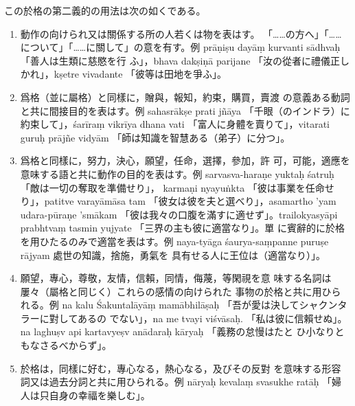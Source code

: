 \begin{enumerate}[label=(\arabic*)]
この於格の第二義的の用法は次の如くである。
\begin{enumerate}[label=(\alph*)]
\item 動作の向けられ又は關係する所の人若くは物を表はす。
「……の方へ」「……について」「……に關して」の意を有す。例
prāṇiṣu dayāṃ kurvanti sādhvaḥ 「善人は生類に慈愍を行
ふ」，bhava dakṣiṇā parijane 「汝の從者に禮儀正しかれ」，kṣetre
vivadante 「彼等は田地を爭ふ」。
\item 爲格（並に屬格）と同樣に，贈與，報知，約束，購買，賣渡
の意義ある動詞と共に間接目的を表はす。例 sahasrākṣe prati\-%
jñāya 「千眼（のインドラ）に約束して」，śarīraṃ vikrīya dhana\-%
vati 「富人に身體を賣りて」，vitarati guruḥ prājñe vidyām
「師は知識を智慧ある（弟子）に分つ」。
\item 爲格と同樣に，努力，決心，願望，任命，選擇，參加，許
可，可能，適應を意味する語と共に動作の目的を表はす。例
sarvasva-haraṇe yuktaḥ śatruḥ 「敵は一切の奪取を準備せり」，
karmaṇi nyayuṅkta 「彼は事業を任命せり」，patitve varayāmāsa
tam 「彼女は彼を夫と選べり」，asamartho 'yam udara-pūraṇe
'smākam 「彼は我々の口腹を滿すに適せず」。trailokyasyāpi
prabhtvaṃ tasmin yujyate 「三界の主も彼に適當なり」。單
に賓辭的に於格を用ひたるのみで適當を表はす。例 naya-tyāga\-%
śaurya-saṃpanne puruṣe rājyam 處世の知識，捨施，勇氣を
具有せる人に王位は（適當なり）」。
\item 願望，專心，尊敬，友情，信賴，同情，侮蔑，等閑視を意
味する名詞は屢々（屬格と同じく）これらの感情の向けられた
事物の於格と共に用ひられる。例 na kalu Śakuntalāyāṃ
mamābhilāṣaḥ 「吾が愛は決してシャクンタラーに對してあるの
でない」，na me tvayi viśvāsaḥ. 「私は彼に信賴せぬ」。na
laghuṣv api kartavyeṣv anādaraḥ kāryaḥ 「義務の怠慢はたと
ひ小なりともなさるべからず」。
\item 於格は，同樣に好む，專心なる，熱心なる，及びその反對
を意味する形容詞又は過去分詞と共に用ひられる。例 nāryaḥ
kevalaṃ svasukhe ratāḥ 「婦人は只自身の幸福を樂しむ」。
\end{enumerate}
\end{enumerate}

